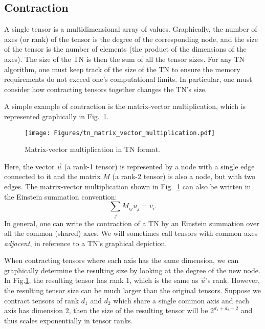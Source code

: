 \subsection{Contraction} \label{sec:contraction}

A single tensor is a multidimensional array of values.
Graphically, the number of axes (or rank) of the tensor is the degree of the corresponding node, and the size of the tensor is the number of elements (the product of the dimensions of the axes).
The size of the TN is then the sum of all the tensor sizes.
For any TN algorithm, one must keep track of the size of the TN to ensure the memory requirements do not exceed one's computational limits.
In particular, one must consider how contracting tensors together changes the TN's size.

A simple example of contraction is the matrix-vector multiplication, which is represented graphically in Fig.~\ref{fig:tn_mat-vec_multiplication}.
\begin{figure}[htbp]
    \centering
    \texttt{[image: Figures/tn\_matrix\_vector\_multiplication.pdf]}
    \caption{\label{fig:tn_mat-vec_multiplication}Matrix-vector multiplication in TN format.}
\end{figure}
Here, the vector $\vec{u}$ (a rank-1 tensor) is represented by a node with a single edge connected to it and the matrix $M$ (a rank-2 tensor) is also a node, but with two edges.
The matrix-vector multiplication shown in Fig.~\ref{fig:tn_mat-vec_multiplication} can also be written in the Einstein summation convention:
\begin{equation}\label{eq:einsum}
    \sum_j M_{ij}u_j = v_i.
\end{equation}
In general, one can write the contraction of a TN by an Einstein summation over all the common (shared) axes.
We will sometimes call tensors with common axes \emph{adjacent}, in reference to a TN's graphical depiction.

When contracting tensors where each axis has the same dimension, we can graphically determine the resulting size by looking at the degree of the new node.
In Fig.\ref{fig:tn_mat-vec_multiplication}, the resulting tensor has rank 1, which is the same as $\vec{u}$'s rank.
However, the resulting tensor size can be much larger than the original tensors.
Suppose we contract tensors of rank $d_1$ and $d_2$ which share a single common axis and each axis has dimension $2$, then the size of the resulting tensor will be $2^{d_1 + d_2 - 2}$ and thus scales exponentially in tensor ranks.


